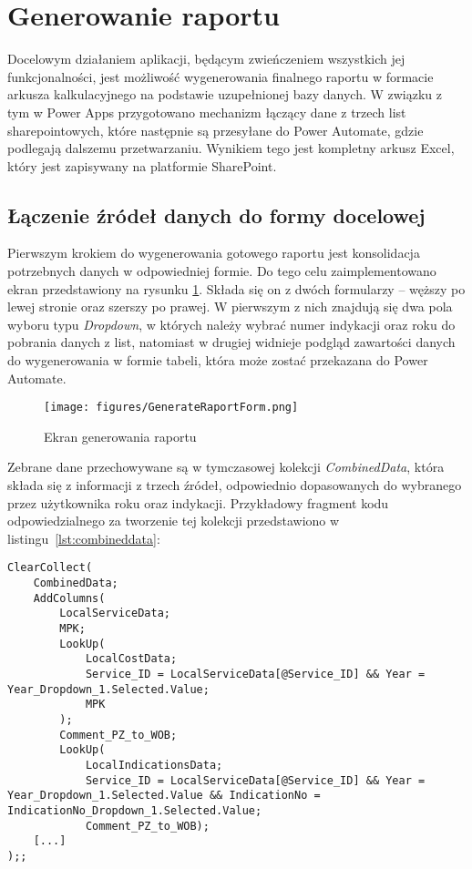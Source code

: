 \section{Generowanie raportu}

Docelowym działaniem aplikacji, będącym zwieńczeniem wszystkich jej funkcjonalności, jest możliwość wygenerowania finalnego raportu w formacie arkusza kalkulacyjnego na podstawie uzupełnionej bazy danych. W związku z tym w Power Apps przygotowano mechanizm łączący dane z trzech list sharepointowych, które następnie są przesyłane do Power Automate, gdzie podlegają dalszemu przetwarzaniu. Wynikiem tego jest kompletny arkusz Excel, który jest zapisywany na platformie SharePoint.

\subsection{Łączenie źródeł danych do formy docelowej}

Pierwszym krokiem do wygenerowania gotowego raportu jest konsolidacja potrzebnych danych w odpowiedniej formie. Do tego celu zaimplementowano ekran przedstawiony na rysunku \ref{fig:generateraportform}. Składa się on z dwóch formularzy -- węższy po lewej stronie oraz szerszy po prawej. W pierwszym z nich znajdują się dwa 
pola wyboru typu \emph{Dropdown}, w których należy wybrać numer indykacji oraz roku do pobrania danych z list, natomiast w drugiej widnieje podgląd zawartości danych do wygenerowania w formie tabeli, która może zostać przekazana do Power Automate.

\begin{figure}[H]
    \centering
    \texttt{[image: figures/GenerateRaportForm.png]}
    \caption{Ekran generowania raportu} 
    \label{fig:generateraportform}
\end{figure}

Zebrane dane przechowywane są w tymczasowej kolekcji \textit{CombinedData}, która składa się z informacji z trzech źródeł, odpowiednio dopasowanych do wybranego przez użytkownika roku oraz indykacji. Przykładowy fragment kodu odpowiedzialnego za tworzenie tej kolekcji przedstawiono w listingu~\ref{lst:combineddata}:

\begin{lstlisting}[language=PowerFx, caption={Fragment kodu tworzącego kolekcję CombinedData}, label={lst:combineddata}] 
    ClearCollect(
    CombinedData;
    AddColumns(
        LocalServiceData;
        MPK;
        LookUp(
            LocalCostData;
            Service_ID = LocalServiceData[@Service_ID] && Year = Year_Dropdown_1.Selected.Value;
            MPK
        );
        Comment_PZ_to_WOB;
        LookUp(
            LocalIndicationsData;
            Service_ID = LocalServiceData[@Service_ID] && Year = Year_Dropdown_1.Selected.Value && IndicationNo = IndicationNo_Dropdown_1.Selected.Value;
            Comment_PZ_to_WOB);     
    [...]
);;

\end{lstlisting}

